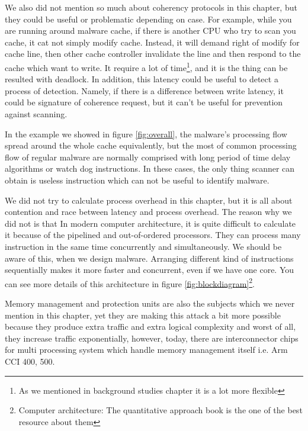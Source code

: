 We also did not mention so much about coherency protocols in this chapter, but they could be useful or problematic depending on case. For example, while you are running around malware cache, if there is another CPU who try to scan you cache, it cat not simply modify cache. Instead, it will demand right of modify for cache line, then other cache controller invalidate the line and then respond to the cache which want to write. It require a lot of time\footnote{As we mentioned in background studies chapter it is a lot more flexible}, and it is the thing can be resulted with deadlock. In addition, this latency could be useful to detect a process of detection. Namely, if there is a difference between write latency, it could be signature of coherence request, but it can't be useful for prevention against scanning.

In the example we showed in figure \ref{fig:overall}, the malware's processing flow spread around the whole cache equivalently, but the most of common processing flow of regular malware are normally comprised with long period of time delay algorithms or watch dog instructions. In these cases, the only thing scanner can obtain is useless instruction which can not be useful to identify malware.

We did not try to calculate process overhead in this chapter, but it is all about contention and race between latency and process overhead. The reason why we did not is that In modern computer architecture, it is quite difficult to calculate it because of the pipelined and out-of-ordered processors. They can process many instruction in the same time concurrently and simultaneously. We should be aware of this, when we design malware. Arranging different kind of instructions sequentially makes it more faster and concurrent, even if we have one core. You can see more details of this architecture in figure \ref{fig:blockdiagram}\footnote{Computer architecture: The quantitative approach book is the one of the best resource about them\cite{ComputerArchCoursera}}.

Memory management and protection units are also the subjects which we never mention in this chapter, yet they are making this attack a bit more possible because they produce extra traffic and extra logical complexity and worst of all, they increase traffic exponentially, however, today, there are interconnector chips for multi processing system which handle memory management itself i.e. Arm CCI 400, 500.